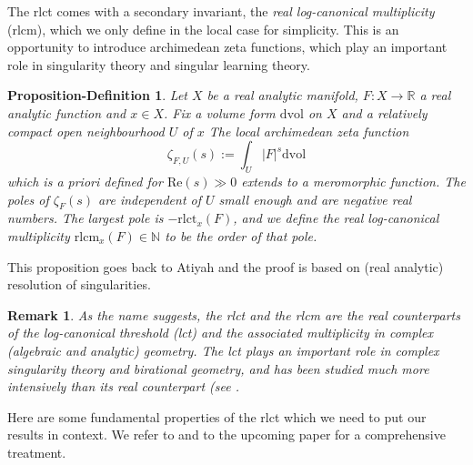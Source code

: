 \documentclass[a4paper]{amsart}
\newcommand{\R}{\mathbb{R}}
\newcommand{\N}{\mathbb{N}}
\newcommand{\rlct}{\mathrm{rlct}}
\newcommand{\rlcm}{\mathrm{rlcm}}
\newtheorem{propdefn}[thm]{Proposition-Definition}
\theoremstyle{plain}
\newtheorem{remark}[thm]{Remark}
\begin{document}
The rlct comes with a secondary invariant, the \emph{real log-canonical multiplicity} (rlcm), which we only define in the local case for simplicity. This is an opportunity to introduce archimedean zeta functions, which play an important role in singularity theory and singular learning theory.

\begin{propdefn}
     Let $X$ be a real analytic manifold, $F:X\to \R$ a real analytic function and $x\in X$. Fix a volume form $\mathrm{dvol}$ on $X$ and a relatively compact open neighbourhood $U$ of $x$ The \emph{local archimedean zeta function}
     \[
     \zeta_{F,U}(s):= \int_U |F|^s \mathrm{dvol}
     \]
     which is a priori defined for $\mathrm{Re}(s)\gg 0$ extends to a meromorphic function. The poles of $ \zeta_{F}(s)$ are independent of $U$ small enough and are negative real numbers. The largest pole is $-\rlct_x(F)$, and we define the \emph{real log-canonical multiplicity} $\rlcm_x(F)\in \N$ to be the order of that pole.
\end{propdefn}

This proposition goes back to Atiyah \cite{atiyah} and the proof is based on (real analytic) resolution of singularities.

\begin{remark}\label{rmk:rlct_vs_lct}
As the name suggests, the rlct and the rlcm are the real counterparts of the \emph{log-canonical threshold} (lct) and the associated multiplicity in complex (algebraic and analytic) geometry. The lct plays an important role in complex singularity theory and birational geometry, and has been studied much more intensively than its real counterpart (see \cite{mustata:lct-survey,kollar:lct-survey}.
\end{remark}

Here are some fundamental properties of the rlct which we need to put our results in context. We refer to \cite{lin:phd_thesis} and to the upcoming paper \cite{spl:real-jets} for a comprehensive treatment.
\end{document}
